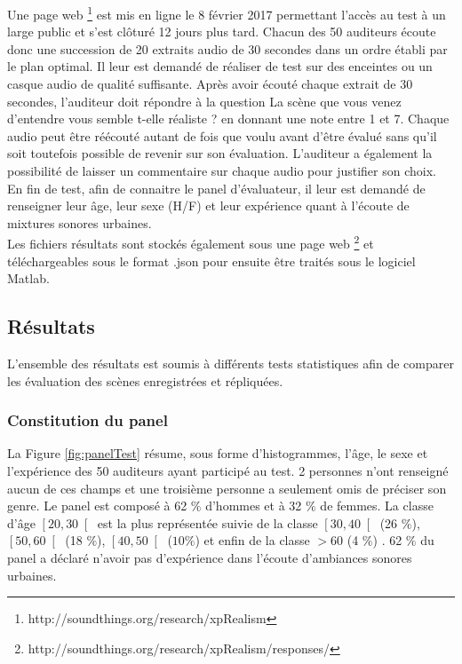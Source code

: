 {Une page web \footnote{http://soundthings.org/research/xpRealism} est mis en ligne le 8 février 2017 permettant l'accès au test à un large public et s'est clôturé 12 jours plus tard. Chacun des 50 auditeurs écoute donc une succession de 20 extraits audio de 30 secondes dans un ordre établi par le plan optimal. Il leur est demandé de réaliser de test sur des enceintes ou un casque audio de qualité suffisante. Après avoir écouté chaque extrait de 30 secondes, l'auditeur doit répondre à la question \og La scène que vous venez d'entendre vous semble t-elle réaliste ? \fg{} en donnant une note entre 1 et 7. Chaque audio peut être réécouté autant de fois que voulu avant d'être évalué sans qu'il soit toutefois possible de revenir sur son évaluation. L'auditeur a également la possibilité de laisser un commentaire sur chaque audio pour justifier son choix. En fin de test, afin de connaitre le panel d'évaluateur, il leur est demandé de renseigner leur âge, leur sexe (H/F) et leur expérience quant à l'écoute de mixtures sonores urbaines.\\

Les fichiers résultats sont stockés également sous une page web \footnote{http://soundthings.org/research/xpRealism/responses/} et téléchargeables sous le format .json pour ensuite être traités sous le logiciel Matlab.\\

\subsection{Résultats}

L'ensemble des résultats est soumis à différents tests statistiques afin de comparer les évaluation des scènes enregistrées et répliquées.

\subsubsection{Constitution du panel}

La Figure \ref{fig:panelTest} résume, sous forme d'histogrammes, l'âge, le sexe et l'expérience des 50 auditeurs ayant participé au test. 2 personnes n'ont renseigné aucun de ces champs et une troisième personne a seulement omis de préciser son genre. Le panel est composé à 62 $\%$ d'hommes et à 32 $\%$ de femmes. La classe d'âge $\left[20,30\right[$ est la plus représentée suivie de la classe $\left[30,40\right[$ (26 $\%$), $\left[50,60\right[$ (18 $\%$), $\left[40,50\right[$ ($10\%$) et enfin de la classe $>60$ (4 $\%$) . 62 $\%$ du panel a déclaré n'avoir pas d'expérience dans l'écoute d'ambiances sonores urbaines.\\

}

